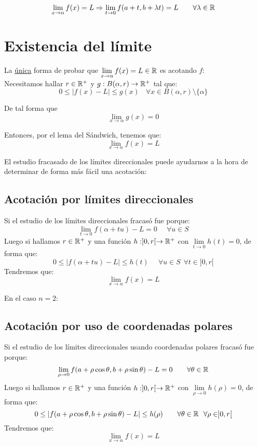 $$\lim_{x \to \alpha}f(x) = L \Rightarrow \lim_{t \to 0}f(a+t,b+\lambda t) = L~~~~~~ \forall \lambda \in \mathbb R$$

\section{Existencia del límite}

La \underline{única} forma de probar que $\lim\limits_{x \to \alpha}f(x) = L \in \mathbb R$ es acotando $f$:\\


Necesitamos hallar $r \in \mathbb R^{+}$ y $g:B(\alpha,r)\rightarrow \mathbb R^{+}$ tal que:
$$0 \leq \left| f(x) - L \right| \leq g(x) ~~~~\forall x \in B(\alpha,r)\setminus\{\alpha\}$$

De tal forma que $$\lim_{x \to \alpha}g(x) = 0$$


Entonces, por el lema del Sándwich, tenemos que:
$$\lim_{x \to \alpha}f(x) = L$$


El estudio fracasado de los límites direccionales puede ayudarnos a la hora de determinar de
forma más fácil una acotación:

\subsection{Acotación por límites direccionales}

Si el estudio de los límites direccionales fracasó fue porque:
$$\lim_{t \to 0}f(\alpha + tu)-L = 0~~~~~~\forall u \in S$$
Luego si hallamos $r \in \mathbb R^{+}$ y una función $h:]0,r[\rightarrow \mathbb R^{+}$ con $\lim\limits_{t\to 0}h(t) = 0$,
de forma que:
$$0 \leq |f(\alpha + tu)-L| \leq h(t)~~~~~~\forall u \in S~~\forall t \in ]0,r[$$
Tendremos que: $$\lim_{x \to \alpha}f(x) = L$$


En el caso $n=2$:
\subsection{Acotación por uso de coordenadas polares}

Si el estudio de los límites direccionales usando coordenadas polares fracasó fue porque:
$$\lim_{\rho \to 0}f(a + \rho \cos\theta, b + \rho \sin\theta)-L = 0~~~~~~\forall \theta \in \mathbb R$$
Luego si hallamos $r \in \mathbb R^{+}$ y una función $h:]0,r[\rightarrow \mathbb R^{+}$ con $\lim\limits_{\rho\to 0}h(\rho) = 0$,
de forma que:
$$0 \leq |f(a+\rho \cos\theta,b+\rho \sin\theta)-L| \leq h(\rho)~~~~~~\forall \theta \in \mathbb R~~\forall \rho \in ]0,r[$$
Tendremos que: $$\lim_{x \to \alpha}f(x) = L$$

